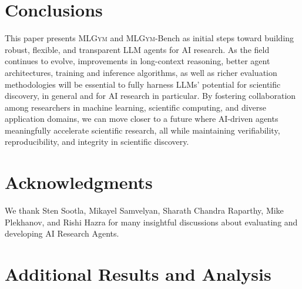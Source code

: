 \documentclass[]{fairmeta}
\newcommand{\mlgym}{\fontfamily{lmr}\selectfont\mdseries\textsc{MLGym}\xspace}
\begin{document}
\section{Conclusions}
\label{sec:conclusion}

This paper presents \textsc{\mlgym} and \mlgym-Bench as initial steps toward building robust, flexible, and transparent LLM agents for AI research. As the field continues to evolve, improvements in long-context reasoning, better agent architectures, training and inference algorithms, as well as richer evaluation methodologies will be essential to fully harness LLMs’ potential for scientific discovery, in general and for AI research in particular. By fostering collaboration among researchers in machine learning, scientific computing, and diverse application domains, we can move closer to a future where AI-driven agents meaningfully accelerate scientific research, all while maintaining verifiability, reproducibility, and integrity in scientific discovery.







\section{Acknowledgments}
\label{sec:ack}
We thank Sten Sootla, Mikayel Samvelyan, Sharath Chandra Raparthy, Mike Plekhanov, and Rishi Hazra for many insightful discussions about evaluating and developing AI Research Agents.



\clearpage
\newpage



\clearpage
\newpage
\beginappendix


\section{Additional Results and Analysis}
\label{sec:additional_results}
\end{document}
